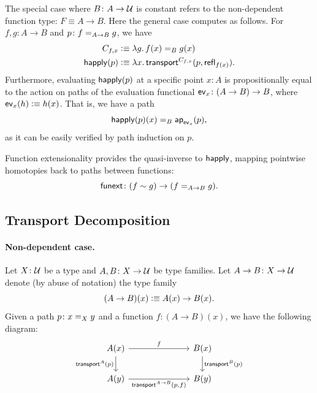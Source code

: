 The special case where\/ $B\colon A\to\univ$ is constant refers to the non-dependent function type: $F\equiv A\to B$. Here the general case computes as follows. For\/ $f,g\colon A\to B$ and\/ $p\colon f\eq{A\to B}g$, we have
\begin{align*}
    C_{f,x}&\mathrel{\vcentcolon}\equiv\lambda g.\,f(x)\mathrel{=_{B}}g(x)\\
    \mathsf{happly}(p)&\mathrel{\vcentcolon}\equiv\lambda x.\,
                \mathsf{transport}^{C_{f,x}}(p,\mathsf{refl}_{f(x)}).
\end{align*}
Furthermore, evaluating\/ $\mathsf{happly}(p)$ at a specific point\/ $x\colon A$ is propositionally equal to the action on paths of the evaluation functional\/ $\fun{ev}_x\colon (A\to B)\to B$, where\/ $\mathsf{ev}_x(h)\mathrel{\vcentcolon}\equiv h(x)$. That is, we have a path
\begin{equation}\label{eq:happly-is-ap-ev}
    \mathsf{happly}(p)(x) \mathrel{=_{B}} \mathsf{ap}_{\mathsf{ev}_x}(p),
\end{equation}
as it can be easily verified by path induction on $p$.

Function extensionality provides the quasi-inverse to\/ $\mathsf{happly}$, mapping pointwise homotopies back to paths between functions:
\[
    \fun{funext}\colon (f\sim g) \to (f\eq{A\to B}g).
\]

\subsection*{Transport Decomposition}\label{subs:transport-decomposition}

\paragraph{Non-dependent case.} Let\/ $X\colon\univ$ be a type and\/ $A,B\colon X\to\univ$ be type families. Let\/ $A\to B\colon X\to\univ$ denote (by abuse of notation) the type family
\[
    (A\to B)(x)\mathrel{\vcentcolon}\equiv A(x)\to B(x).
\]
Given a path\/ $p\colon x\eq X y$ and a function\/ $f\colon (A\to B)(x)$, we have the following diagram:
\begin{equation}\label{tik:non-dependent-transport-composition}
    \begin{tikzcd}[column sep=2.5cm]
        A(x) 
            \arrow[r, "f"] 
            \arrow[d, "{\fun{transport}^A(p)}"'] 
        & B(x) 
            \arrow[d, "{\fun{transport}^B(p)}"] 
        \\
        A(y) 
            \arrow[r, "{\fun{transport}^{A\to B}(p, f)}"'] 
        & B(y)
    \end{tikzcd}
\end{equation}

